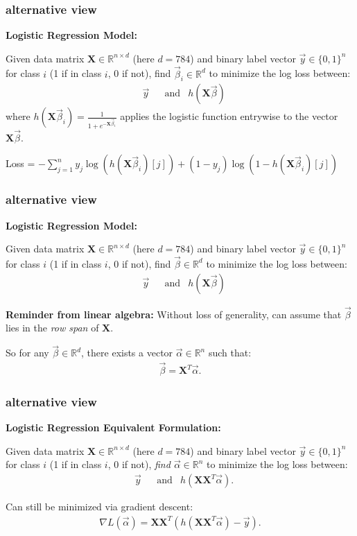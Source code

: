 \documentclass[handout,compress]{beamer}
\newcommand{\bv}[1]{\mathbf{#1}}
\newcommand{\R}{\mathbb{R}}
\begin{document}
\begin{frame} 
	\frametitle{alternative view}
	\textbf{Logistic Regression Model:}
	
	Given data matrix $\bv{X} \in \R^{n\times d}$ (here $d = 784$) and binary label vector $\vec{y}\in \{0,1\}^n$ for class $i$ (1 if in class $i$, 0 if not), find $\vec{\beta}_i \in \R^d$ to minimize the log loss between:
	\begin{align*}
	&\vec{y} & &\text{and} & h(\bv{X}\vec{\beta})
	\end{align*}
	where $h(\bv{X}\vec{\beta}_i) = \frac{1}{1 + e^{-\bv{X}\vec{\beta}_i}}$ applies the logistic function entrywise to the vector $\bv{X}\vec{\beta}$.
	
	
	Loss = $-\sum_{j=1}^n y_j\log(h(\bv{X}\vec{\beta}_i)[j]) +  (1-y_j)\log(1- h(\bv{X}\vec{\beta}_i)[j])$
	
\end{frame}

\begin{frame} 
	\frametitle{alternative view}
		\textbf{Logistic Regression Model:}
	
	Given data matrix $\bv{X} \in \R^{n\times d}$ (here $d = 784$) and binary label vector $\vec{y}\in \{0,1\}^n$ for class $i$ (1 if in class $i$, 0 if not), find $\vec{\beta} \in \R^d$ to minimize the log loss between:
	\begin{align*}
	&\vec{y} & &\text{and} & h(\bv{X}\vec{\beta})
	\end{align*}
	
		
	\textbf{Reminder from linear algebra:}
	Without loss of generality, can assume that $\vec{\beta}$ lies in the \emph{row span} of $\bv{X}$. 
	
	So for any $\vec{\beta} \in \R^d$, there exists a vector $\vec{\alpha}\in \R^n$ such that:
	\begin{align*}
	\vec{\beta} = \bv{X}^T \vec{\alpha}.
	\end{align*}
	
\end{frame}

\begin{frame} 
	\frametitle{alternative view}
	\textbf{Logistic Regression Equivalent Formulation:}
	
	Given data matrix $\bv{X} \in \R^{n\times d}$ (here $d = 784$) and binary label vector $\vec{y}\in \{0,1\}^n$ for class $i$ (1 if in class $i$, 0 if not), \alert{\emph{find $\vec{\alpha} \in \R^n$}} to minimize the log loss between:
	\begin{align*}
	&\vec{y} & &\text{and} & h(\bv{X}\bv{X}^T\vec{\alpha}).
	\end{align*}
	
	Can still be minimized via gradient descent:
	\begin{align*}
		\nabla L(\vec{\alpha}) = \bv{X}\bv{X}^T(h(\bv{X}\bv{X}^T\vec{\alpha}) - \vec{y}).
	\end{align*}
	
\end{frame}
\end{document}
